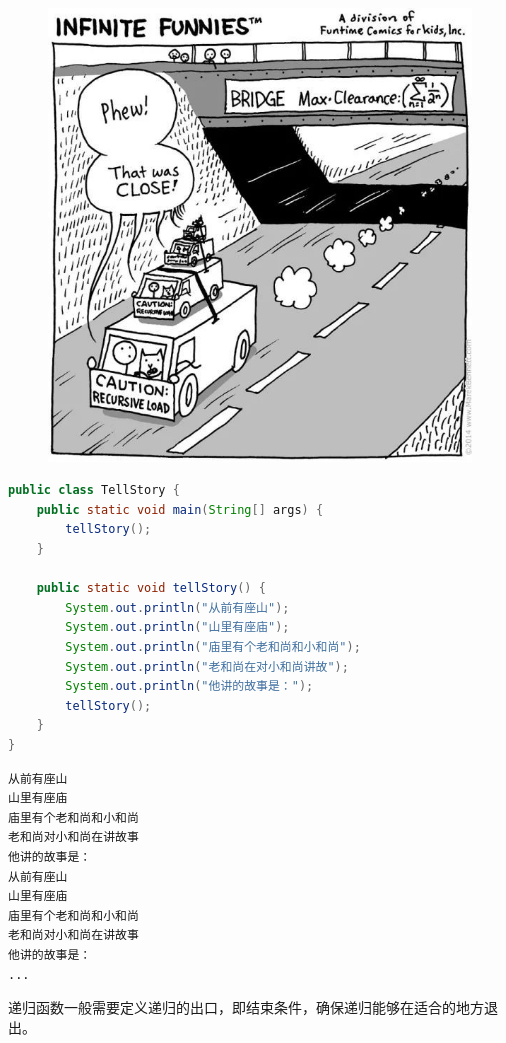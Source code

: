 \begin{figure}[H]
	\centering
	\includegraphics[scale=0.6]{img/C6/6-2/5.png}
\end{figure}


\begin{lstlisting}[language=Java]
public class TellStory {
	public static void main(String[] args) {
		tellStory();
	}
	
	public static void tellStory() {
		System.out.println("从前有座山");
		System.out.println("山里有座庙");
		System.out.println("庙里有个老和尚和小和尚");
		System.out.println("老和尚在对小和尚讲故");
		System.out.println("他讲的故事是：");
		tellStory();
	}
}
\end{lstlisting}

\begin{tcolorbox}
	\begin{verbatim}
从前有座山
山里有座庙
庙里有个老和尚和小和尚
老和尚对小和尚在讲故事
他讲的故事是：
从前有座山
山里有座庙
庙里有个老和尚和小和尚
老和尚对小和尚在讲故事
他讲的故事是：
...
	\end{verbatim}
\end{tcolorbox}

递归函数一般需要定义递归的出口，即结束条件，确保递归能够在适合的地方退出。\\

